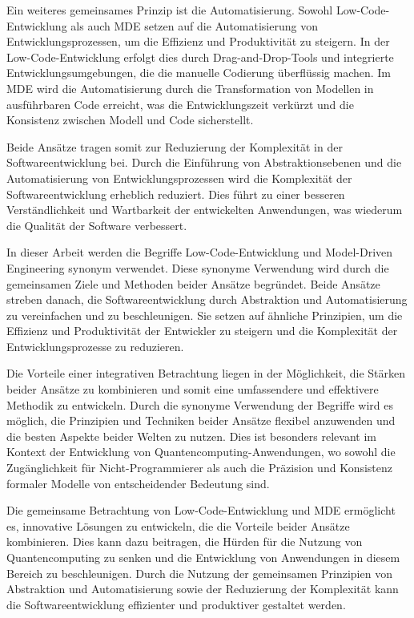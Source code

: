Ein weiteres gemeinsames Prinzip ist die Automatisierung. Sowohl Low-Code-Entwicklung als auch MDE setzen auf die Automatisierung 
von Entwicklungsprozessen, um die Effizienz und Produktivität zu steigern. In der Low-Code-Entwicklung erfolgt dies durch 
Drag-and-Drop-Tools und integrierte Entwicklungsumgebungen, die die manuelle Codierung überflüssig machen. Im MDE wird die 
Automatisierung durch die Transformation von Modellen in ausführbaren Code erreicht, was die Entwicklungszeit verkürzt und die 
Konsistenz zwischen Modell und Code sicherstellt.

Beide Ansätze tragen somit zur Reduzierung der Komplexität in der Softwareentwicklung bei. Durch die Einführung von 
Abstraktionsebenen und die Automatisierung von Entwicklungsprozessen wird die Komplexität der Softwareentwicklung erheblich 
reduziert. Dies führt zu einer besseren Verständlichkeit und Wartbarkeit der entwickelten Anwendungen, was wiederum die 
Qualität der Software verbessert.

In dieser Arbeit werden die Begriffe Low-Code-Entwicklung und Model-Driven Engineering synonym verwendet. Diese synonyme Verwendung 
wird durch die gemeinsamen Ziele und Methoden beider Ansätze begründet. Beide Ansätze streben danach, die Softwareentwicklung 
durch Abstraktion und Automatisierung zu vereinfachen und zu beschleunigen. Sie setzen auf ähnliche Prinzipien, um die Effizienz 
und Produktivität der Entwickler zu steigern und die Komplexität der Entwicklungsprozesse zu reduzieren.

Die Vorteile einer integrativen Betrachtung liegen in der Möglichkeit, die Stärken beider Ansätze zu kombinieren und 
somit eine umfassendere und effektivere Methodik zu entwickeln. Durch die synonyme Verwendung der Begriffe wird es möglich, 
die Prinzipien und Techniken beider Ansätze flexibel anzuwenden und die besten Aspekte beider Welten zu nutzen. Dies ist 
besonders relevant im Kontext der Entwicklung von Quantencomputing-Anwendungen, wo sowohl die Zugänglichkeit für Nicht-Programmierer 
als auch die Präzision und Konsistenz formaler Modelle von entscheidender Bedeutung sind.

Die gemeinsame Betrachtung von Low-Code-Entwicklung und MDE ermöglicht es, innovative Lösungen zu entwickeln, die die Vorteile 
beider Ansätze kombinieren. Dies kann dazu beitragen, die Hürden für die Nutzung von Quantencomputing zu senken und die Entwicklung 
von Anwendungen in diesem Bereich zu beschleunigen. Durch die Nutzung der gemeinsamen Prinzipien von Abstraktion und Automatisierung 
sowie der Reduzierung der Komplexität kann die Softwareentwicklung effizienter und produktiver gestaltet werden.

